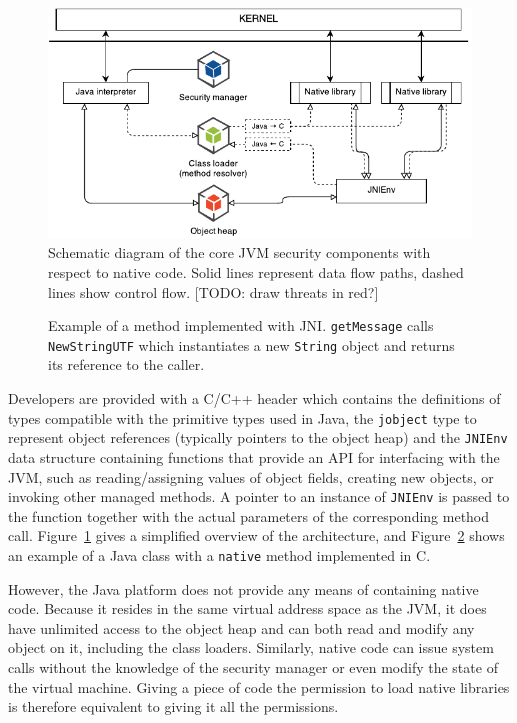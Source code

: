 \documentclass[a4paper,12pt,twoside,openright]{report}
\begin{document}
\begin{figure}
	\includegraphics[width=\textwidth]{dia_jni_orig.pdf}
	\caption{Schematic diagram of the core JVM security components with respect to native code. Solid lines represent data flow paths, dashed lines show control flow. [TODO: draw threats in red?]}
	\label{fig:OverviewJNI}
\end{figure}

\begin{figure}[t]
	
	
	\caption{Example of a method implemented with JNI. \texttt{getMessage} calls \texttt{NewStringUTF} which instantiates a new \texttt{String} object and returns its reference to the caller.}
	\label{listing:HelloJNI}
\end{figure}

Developers are provided with a C/C++ header which contains the definitions of types compatible with the primitive types used in Java, the \texttt{jobject} type to represent object references (typically pointers to the object heap) and the \texttt{JNIEnv} data structure containing functions that provide an API for interfacing with the JVM, such as reading/assigning values of object fields, creating new objects, or invoking other managed methods. A pointer to an instance of \texttt{JNIEnv} is passed to the function together with the actual parameters of the corresponding method call. Figure~\ref{fig:OverviewJNI} gives a simplified overview of the architecture, and Figure~\ref{listing:HelloJNI} shows an example of a Java class with a \texttt{native} method implemented in C.

However, the Java platform does not provide any means of containing native code. Because it resides in the same virtual address space as the JVM, it does have unlimited access to the object heap and can both read and modify any object on it, including the class loaders. Similarly, native code can issue system calls without the knowledge of the security manager or even modify the state of the virtual machine. Giving a piece of code the permission to load native libraries is therefore equivalent to giving it all the permissions.
\end{document}
